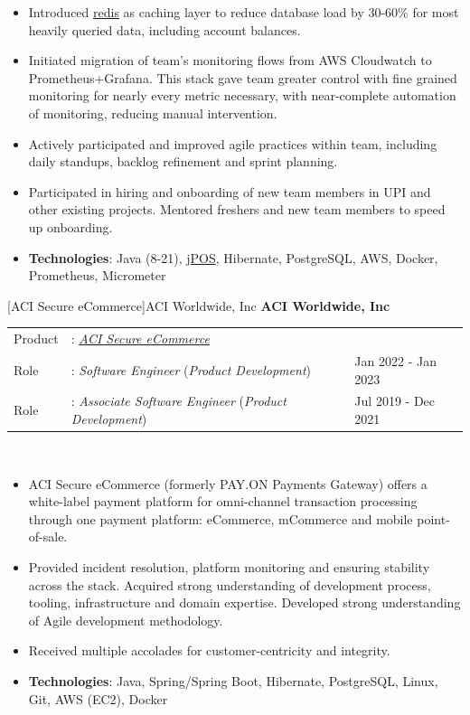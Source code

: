 \documentclass[a4paper]{article}
\begin{document}
\begin{itemize}
  \item Introduced {\href{https://github.com/redis/redis}{redis}} as caching layer to reduce database load by 30-60\% for most heavily queried data, including account balances.
  \item Initiated migration of team's monitoring flows from AWS Cloudwatch to Prometheus+Grafana. This stack gave team greater control with fine grained monitoring for nearly every metric necessary, with near-complete automation of monitoring, reducing manual intervention.  
  \item Actively participated and improved agile practices within team, including daily standups, backlog refinement and sprint planning. 
	\item Participated in hiring and onboarding of new team members in UPI and other existing projects. Mentored freshers and new team members to speed up onboarding.
	\item \textbf{Technologies}: Java (8-21), {\href{https://jpos.org/}{jPOS}}, Hibernate, PostgreSQL, AWS, Docker, Prometheus, Micrometer
\end{itemize}

[ACI Secure eCommerce]{ACI Worldwide, Inc}
\textbf{ACI Worldwide, Inc} \\
\noindent
\begin{tabularx}{\textwidth}{ l l>{\raggedleft\arraybackslash}X}
	Product & : \textit{\href{https://www.aciworldwide.com/solutions/aci-secure-ecommerce}{ACI Secure eCommerce}} &                     \\
	Role    & : \textit{Software Engineer} (\textit{Product Development})                                         & Jan 2022 - Jan 2023 \\
	Role    & : \textit{Associate Software Engineer} (\textit{Product Development})                               & Jul 2019 - Dec 2021 \\
\end{tabularx}
\textbf{} \\
\begin{itemize} \itemsep 1pt
	\item ACI Secure eCommerce (formerly PAY.ON Payments Gateway) offers a white-label payment platform for omni-channel transaction processing through one payment platform: eCommerce, mCommerce and mobile point-of-sale.
	\item Provided incident resolution, platform monitoring and ensuring stability across the stack. Acquired strong understanding of development process, tooling, infrastructure and domain expertise. Developed strong understanding of Agile development methodology.
	\item Received multiple accolades for customer-centricity and integrity.
	\item \textbf{Technologies}: Java, Spring/Spring Boot, Hibernate, PostgreSQL, Linux, Git, AWS (EC2), Docker
\end{itemize}
\end{document}
